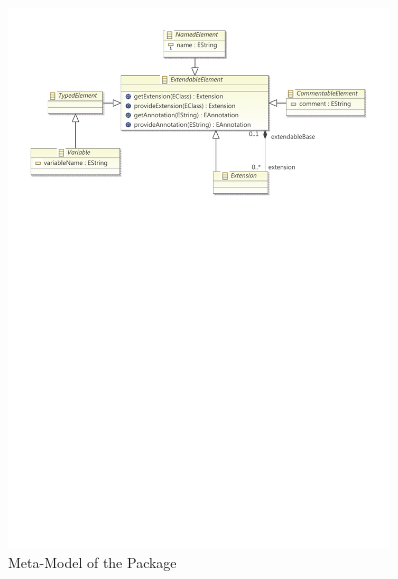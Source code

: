 %
%

\begin{figure}[htb]
  \centering
  \includegraphics[width=0.9\textwidth]{figures/packages/modeling/ModelingDiag}
  \caption{Meta-Model of the  Package}
  \label{fig:MM:modeling}
\end{figure}
